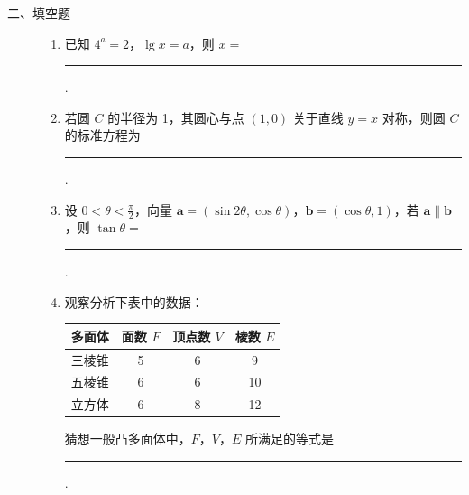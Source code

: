 \begin{description}

    \item[二、填空题]

    \begin{enumerate}[leftmargin=5pt]

      \addtocounter{enumi}{+10}

        \item 已知 \(4^{a} = 2\)，\(\lg x = a\)，则 \(x =\)\rule[-0.3ex]{3em}{0.4pt}.

        \item 若圆 \(C\) 的半径为 1，其圆心与点 \((1,0)\) 关于直线 \(y = x\) 对称，则圆 \(C\) 的标准方程为\rule[-0.3ex]{3em}{0.4pt}.

        \item 设 \(0 < \theta < \frac{\pi}{2}\)，向量 \(\bm{a} = (\sin 2\theta, \cos \theta)\)，\(\bm{b} = (\cos \theta, 1)\)，若 \(\bm{a} \parallel \bm{b}\)，则 \(\tan \theta =\)\rule[-0.3ex]{3em}{0.4pt}.

        \item 观察分析下表中的数据：
\begin{center}
\small
\begin{tabular}{c|ccc}
\hline
多面体 & 面数 \(F\) & 顶点数 \(V\) & 棱数 \(E\) \\
\hline
三棱锥 & 5 & 6 & 9 \\
五棱锥 & 6 & 6 & 10 \\
立方体 & 6 & 8 & 12 \\
\hline
\end{tabular}
\end{center}

猜想一般凸多面体中，\(F\)，\(V\)，\(E\) 所满足的等式是\rule[-0.3ex]{3em}{0.4pt}.

    \end{enumerate}

\end{description}

